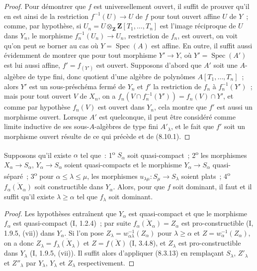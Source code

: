 \begin{proof}
Pour démontrer que $f$ est universellement ouvert, il suffit de prouver qu'il
en est ainsi de la restriction $f^{-1}(U)\to U$ de $f$ pour tout ouvert affine
$U$ de $Y$~; comme, par hypothèse, si
$U_n=U\otimes_{\mathbf Z}\mathbf Z[T_1,\ldots,T_n]$ est l'image réciproque de
$U$ dans $Y_n$, le morphisme $f_n^{-1}(U_n)\to U_n$, restriction de $f_n$, est
ouvert, on voit qu'on peut se borner au cas où $Y=\operatorname{Spec}(A)$ est
affine. En outre, il suffit aussi évidemment de montrer que pour tout
morphisme $Y'\to Y$, où $Y'=\operatorname{Spec}(A')$ est lui aussi affine,
$f'=f_{(Y')}$ est ouvert. Supposons d'abord que $A'$ soit une $A$-algèbre de
type fini, donc quotient d'une algèbre de polynômes $A[T_1,\ldots,T_n]$~;
alors $Y'$ est un sous-préschéma fermé de $Y_n$ et $f'$ la
restriction de $f_n$ à $f_n^{-1}(Y')$~; mais pour tout ouvert $V$ de $X_n$,
on a $f_n(V\cap f_n^{-1}(Y'))=f_n(V)\cap Y'$, et comme par hypothèse $f_n(V)$
est ouvert dans $Y_n$, cela montre que $f'$ est aussi un morphisme ouvert.
Lorsque $A'$ est quelconque, il peut être considéré comme limite inductive de
ses sous-$A$-algèbres de type fini $A'_\lambda$, et le fait que $f'$ soit un
morphisme ouvert résulte de ce qui précède et de (8.10.1).
\end{proof}

\begin{proposition}[8.10.3]
Supposons qu'il existe $\alpha$ tel que~: 1\textsuperscript{o} $S_\alpha$ soit
quasi-compact~; 2\textsuperscript{o} les morphismes $X_\alpha\to S_\alpha$,
$Y_\alpha\to S_\alpha$ soient quasi-compacts et le morphisme
$Y_\alpha\to S_\alpha$ quasi-séparé~; 3\textsuperscript{o} pour
$\alpha\leq\lambda\leq\mu$, les morphismes
$u_{\lambda\mu}:S_\mu\to S_\lambda$ soient plats~; 4\textsuperscript{o}
$\overline{f_\alpha(X_\alpha)}$ soit constructible dans $Y_\alpha$. Alors,
pour que $f$ soit dominant, il faut et il suffit qu'il existe
$\lambda\geq\alpha$ tel que $f_\lambda$ soit dominant.
\end{proposition}

\begin{proof}
Les hypothèses entraînent que $Y_\alpha$ est quasi-compact et que le morphisme
$f_\alpha$ est quasi-compact (I, 1.2.4)~; par suite
$\overline{f_\alpha(X_\alpha)}=Z_\alpha$ est pro-constructible (I, 1.9.5,
(vii)) dans $Y_\alpha$. Si l'on pose
$Z_\lambda=w_{\alpha\lambda}^{-1}(Z_\alpha)$ pour $\lambda\geq\alpha$ et
$Z=w_\alpha^{-1}(Z_\alpha)$, on a donc
$Z_\lambda=\overline{f_\lambda(X_\lambda)}$ et
$Z=\overline{f(X)}$ (I, 3.4.8), et $Z_\lambda$ est pro-constructible dans
$Y_\lambda$ (I, 1.9.5, (vii)). Il suffit alors d'appliquer (8.3.13) en
remplaçant $S_\lambda$, $Z'_\lambda$ et $Z''_\lambda$ par $Y_\lambda$,
$Y_\lambda$ et $Z_\lambda$ respectivement.
\end{proof}

